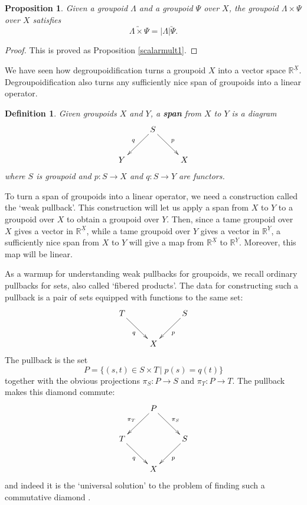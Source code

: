 \documentclass{article}
\renewcommand{\to}{\rightarrow}
\newcommand{\maps}{\colon}
\newcommand{\R}{{\mathbb R}}
\renewcommand{\u}[1]{\underline{#1}}
\newtheorem{definition}[thm]{Definition}
\newtheorem*{proposition*}{Proposition}
\begin{document}
\begin{proposition*}
Given a groupoid $\Lambda$ and a groupoid $\Psi$ over $X$, the groupoid
$\Lambda \times \Psi$ over $X$ satisfies
\[\utilde{\Lambda \times \Psi} = |\Lambda|\utilde{\Psi}.\]
\end{proposition*}
\begin{proof}
This is proved as Proposition \ref{scalarmult1}.
\end{proof}

We have seen how degroupoidification turns a groupoid $X$ into a vector space
$\R^{\u{X}}$.  Degroupoidification also turns any sufficiently 
nice span of groupoids into a linear operator.

\begin{definition}
Given groupoids $X$ and $Y$, a {\bf span} from $X$ to $Y$ is a diagram
\[\xymatrix{
 & S\ar[dl]_q\ar[dr]^p & \\
 Y & & X \\
}\]
where $S$ is groupoid and $p\maps S\to X$ and $q \maps S\to Y$ are functors.
\end{definition}

To turn a span of groupoids into a linear operator, we need a
construction called the `weak pullback'.  This construction will let
us apply a span from $X$ to $Y$ to a groupoid over $X$ to obtain a
groupoid over $Y$.  Then, since a tame groupoid over $X$ gives a
vector in $\R^{\u{X}}$, while a tame groupoid over $Y$ gives a
vector in $\R^{\u{Y}}$, a sufficiently nice span from $X$ to
$Y$ will give a map from $\R^{\u{X}}$ to $\R^{\u{Y}}$.
Moreover, this map will be linear.

As a warmup for understanding weak pullbacks for groupoids, we recall
ordinary pullbacks for sets, also called `fibered products'.
The data for constructing such a pullback is a pair of sets equipped
with functions to the same set:
\[
\xymatrix{
& T \ar[dr]_{q} & & S \ar[dl]^{p} & \\
 & & X & & 
}
\]  
The pullback is the set
\[ P = \lbrace (s,t) \in S \times T \, | \; p(s) = q(t) \rbrace  \]
together with the obvious projections $\pi_S \maps P \to S$ and 
$\pi_T \maps P \to T$.  The pullback makes this diamond commute:
\[
\xymatrix{
& & P \ar[dl]_{\pi_T} \ar[dr]^{\pi_S} & &\\
& T \ar[dr]_{q} & & S \ar[dl]^{p} & \\
 & & X & & 
}
\]  
and indeed it is the `universal solution' to the problem of finding
such a commutative diamond \cite{Mac Lane}.
\end{document}
